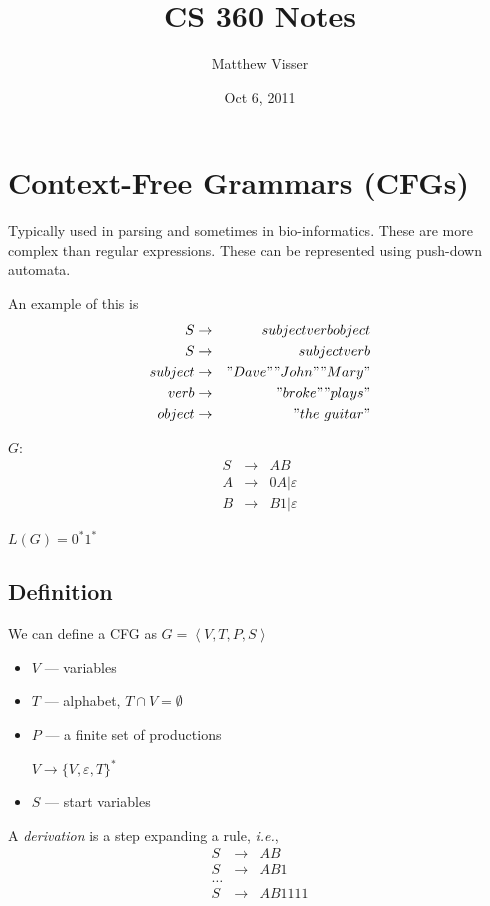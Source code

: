 \documentclass[12pt]{article}
\begin{document}
\title{CS 360 Notes}
\author{Matthew Visser}
\date{Oct  6, 2011}
\maketitle

\section{Context-Free Grammars (CFGs)}

Typically used in parsing and sometimes in bio-informatics. These are more
complex than regular expressions. These can be represented using push-down
automata.

An example of this is
\begin{eqnarray*}
	S &\to& subject verb object \\
	S &\to& subject verb \\
	subject &\to& "Dave" "John" "Mary"\\
	verb &\to& "broke" "plays"\\
	object &\to& "the\ guitar"
\end{eqnarray*}

$G$:
\begin{eqnarray*}
	S &\to& A B\\
	A &\to& 0A | \varepsilon\\
	B &\to& B1 | \varepsilon
\end{eqnarray*}

$L(G) = 0^*1^*$

\subsection{Definition}

We can define a CFG as $G = \left< V,T,P,S\right>$
\begin{itemize}
	\item $V$ --- variables
	\item $T$ --- alphabet, $T \cap V = \emptyset$
	\item $P$ --- a finite set of productions

		$V \to \{V,\varepsilon,T\}^*$
	\item $S$ --- start variables
\end{itemize}

A \emph{derivation} is a step expanding a rule, \textit{i.e.},
\begin{eqnarray*}
	S &\to& AB\\
	S &\to& AB1\\
	\hdots\\
	S &\to& AB1111
\end{eqnarray*}
\end{document}
